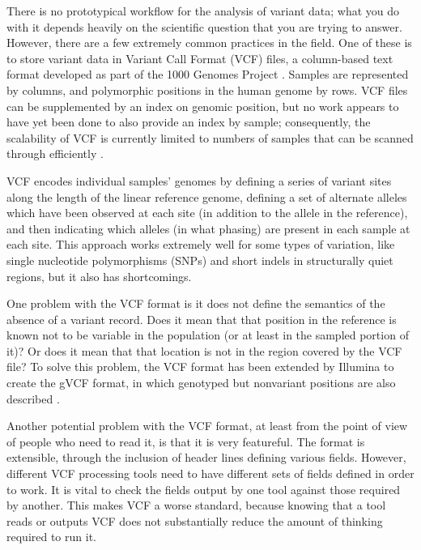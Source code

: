 There is no prototypical workflow for the analysis of variant data; what you do with it depends heavily on the scientific question that you are trying to answer. However, there are a few extremely common practices in the field. One of these is to store variant data in Variant Call Format (VCF) files, a column-based text format developed as part of the 1000 Genomes Project \cite{danecek2011variant}. Samples are represented by columns, and polymorphic positions in the human genome by rows. VCF files can be supplemented by an index on genomic position, but no work appears to have yet been done to also provide an index by sample; consequently, the scalability of VCF is currently limited to numbers of samples that can be scanned through efficiently \cite{danecek2011variant}.

VCF encodes individual samples' genomes by defining a series of variant sites along the length of the linear reference genome, defining a set of alternate alleles which have been observed at each site (in addition to the allele in the reference), and then indicating which alleles (in what phasing) are present in each sample at each site. This approach works extremely well for some types of variation, like single nucleotide polymorphisms (SNPs) and short indels in structurally quiet regions, but it also has shortcomings.

One problem with the VCF format is it does not define the semantics of the absence of a variant record. Does it mean that that position in the reference is known not to be variable in the population (or at least in the sampled portion of it)? Or does it mean that that location is not in the region covered by the VCF file? To solve this problem, the VCF format has been extended by Illumina to create the gVCF format, in which genotyped but nonvariant positions are also described \cite{saunders2014about}.

Another potential problem with the VCF format, at least from the point of view of people who need to read it, is that it is very featureful. The format is extensible, through the inclusion of header lines defining various fields. However, different VCF processing tools need to have different sets of fields defined in order to work. It is vital to check the fields output by one tool against those required by another. This makes VCF a worse standard, because knowing that a tool reads or outputs VCF does not substantially reduce the amount of thinking required to run it.

